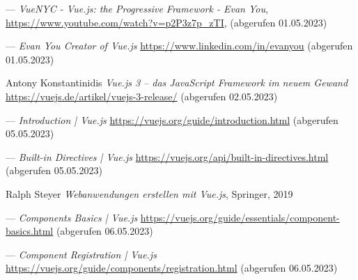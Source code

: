 \begin{thebibliography}{99}
	---
	\emph{VueNYC - Vue.js: the Progressive Framework - Evan You},
	\url{https://www.youtube.com/watch?v=p2P3z7p_zTI},
	(abgerufen 01.05.2023)

	---
	\emph{Evan You Creator of Vue.js}
	\url{https://www.linkedin.com/in/evanyou}
	(abgerufen 01.05.2023)

	Antony Konstantinidis
	\emph{Vue.js 3 – das JavaScript Framework im neuem Gewand}
	\url{https://vuejs.de/artikel/vuejs-3-release/}
	(abgerufen 02.05.2023)

	---
	\emph{Introduction | Vue.js}
	\url{https://vuejs.org/guide/introduction.html}
	(abgerufen 05.05.2023)

	---
	\emph{Built-in Directives | Vue.js}
	\url{https://vuejs.org/api/built-in-directives.html}
	(abgerufen 05.05.2023)

	Ralph Steyer
	\emph{Webanwendungen erstellen mit Vue.js},
	Springer,
	2019

	---
	\emph{Components Basics | Vue.js}
	\url{https://vuejs.org/guide/essentials/component-basics.html}
	(abgerufen 06.05.2023)

	---
	\emph{Component Registration | Vue.js}
	\url{https://vuejs.org/guide/components/registration.html}
	(abgerufen 06.05.2023)


\end{thebibliography}

